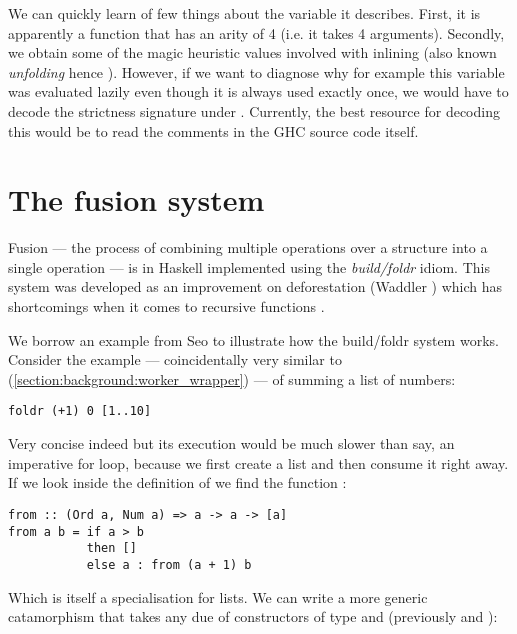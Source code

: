 We can quickly learn of few things about the variable it describes. First,  it is apparently a function that has
an arity of 4 (i.e. it takes 4 arguments). Secondly, we obtain some of the magic heuristic values involved with inlining
(also known \textit{unfolding} hence ). However, if we want to diagnose why for example this variable was evaluated
lazily even though it is always used exactly once, we would have to decode the strictness signature under .
Currently, the best resource for decoding this would be to read the comments in the GHC source code itself.

\section{The fusion system}
\label{section:background:fusion}

Fusion --- the process of combining multiple operations over a structure into a single operation --- is in Haskell
implemented using the \textit{build/foldr} idiom. This system was developed as an improvement on deforestation 
(Waddler \cite{WADLER1990231}) which has shortcomings when it comes to recursive functions \cite{shortcut_fusion}.

We borrow an example from Seo \cite{shortcut_fusion_blog} to illustrate how the build/foldr system works. Consider
the example --- coincidentally very similar to  (\cref{section:background:worker_wrapper}) --- of
summing a list of numbers:

\begin{listing}[H]
\begin{verbatim}
foldr (+1) 0 [1..10]
\end{verbatim}
\end{listing}

Very concise indeed but its execution would be much slower than say, an imperative for loop, because we first create
a list and then consume it right away. If we look inside the definition of \mono{[1..10]} we find the function :

\begin{listing}[H]
\begin{verbatim}
from :: (Ord a, Num a) => a -> a -> [a]
from a b = if a > b
           then []
           else a : from (a + 1) b
\end{verbatim}
\end{listing}

Which is itself a specialisation for lists. We can write a more generic catamorphism that takes any due of constructors
of type  and  (previously \mono{:} and \mono{[]}):

